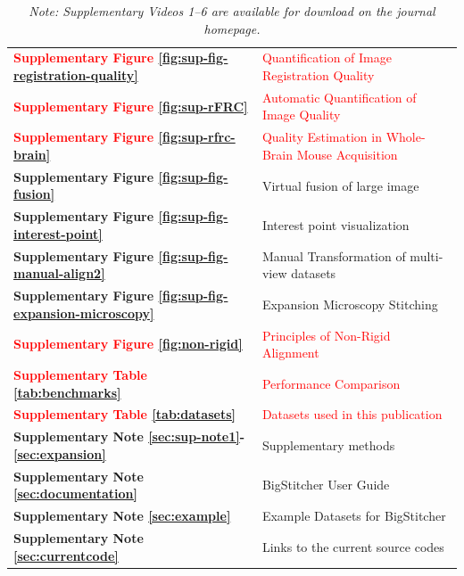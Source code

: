 \documentclass[]{spie}  %
\def\red{\textcolor{red}}
\newcommand\tablespace{\vspace{2.5mm}}
\begin{document}
\begin{table}[h!]
{\begin{tabular}{lp{11cm}}
\textbf{\red{Supplementary Figure \ref{fig:sup-fig-registration-quality}}} & \red{Quantification of Image Registration Quality}\tablespace \\

\textbf{\red{Supplementary Figure \ref{fig:sup-rFRC}}} & \red{Automatic Quantification of Image Quality}\tablespace \\
\textbf{\red{Supplementary Figure \ref{fig:sup-rfrc-brain}}} & \red{Quality Estimation in Whole-Brain Mouse Acquisition}\tablespace \\

\textbf{Supplementary Figure \ref{fig:sup-fig-fusion}} & Virtual fusion of large image \tablespace \\
\textbf{Supplementary Figure \ref{fig:sup-fig-interest-point}} & Interest point visualization \tablespace \\
\textbf{Supplementary Figure \ref{fig:sup-fig-manual-align2}} & Manual Transformation of multi-view datasets \tablespace \\
\textbf{Supplementary Figure \ref{fig:sup-fig-expansion-microscopy}} & Expansion Microscopy Stitching \tablespace \\

\textbf{\red{Supplementary Figure \ref{fig:non-rigid}}} & \red{Principles of Non-Rigid Alignment}\tablespace \\


\textbf{\red{Supplementary Table \ref{tab:benchmarks}}} & \red{Performance Comparison} \tablespace \\
\textbf{\red{Supplementary Table \ref{tab:datasets}}} & \red{Datasets used in this publication} \tablespace \\
\textbf{Supplementary Note \ref{sec:sup-note1}-\ref{sec:expansion}} & Supplementary methods \tablespace \\
\textbf{Supplementary Note \ref{sec:documentation}} & BigStitcher User Guide \tablespace \\
\textbf{Supplementary Note \ref{sec:example}} & Example Datasets for BigStitcher \tablespace \\
\textbf{Supplementary Note \ref{sec:currentcode}} & Links to the current source codes \tablespace \\

\end{tabular}}
\caption{\emph{Note: Supplementary Videos 1--6 are available for download on the journal homepage.}}
\end{table}

\pagebreak
\end{document}
